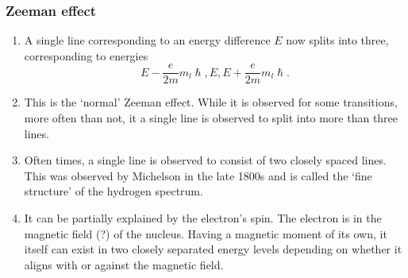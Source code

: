 \documentclass{beamer}
\begin{document}
\begin{frame}
\frametitle{Zeeman effect}
\begin{enumerate}
\item A single line corresponding to an energy difference $E$ now splits into 
three, corresponding to energies 
\[
E - \frac{e}{2m}m_l\hslash, E, E + \frac{e}{2m}m_l\hslash.
\]
\item This is the `normal' Zeeman effect. While it is observed for some 
transitions, more often than not, it a single line is observed to split into
more than three lines.
\item Often times, a single line is observed to consist of two closely spaced
lines. This was observed by Michelson in the late 1800s and is called the 
`fine structure' of the hydrogen spectrum.
\item It can be partially explained by the electron's spin. The electron is in
the magnetic field (?) of the nucleus. Having a magnetic moment of its own, it 
itself can exist in two closely separated energy levels depending on whether it
aligns with or against the magnetic field.
\end{enumerate}
\end{frame}
\end{document}

